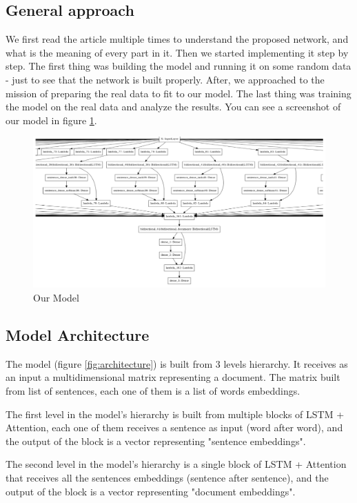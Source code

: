 \documentclass{article}
\begin{document}
\subsection{General approach}
We first read the article multiple times to understand the proposed network, and what is the meaning of every part in it. Then we started implementing it step by step. The first thing was building the model and running it on some random data - just to see that the network is built properly. After, we approached to the mission of preparing the real data to fit to our model. The last thing was training the model on the real data and analyze the results. You can see a screenshot of our model in figure \ref{fig:model}.

\begin{figure}
    \includegraphics[scale=0.7]{Model.PNG}
    \caption{Our Model }
    \label{fig:model}
\end{figure}

\subsection{Model Architecture}
The model (figure \ref{fig:architecture}) is built from 3 levels hierarchy. It receives as an input a multidimensional matrix representing a document. The matrix built from list of sentences, each one of them is a list of words embeddings.

The first level in the model's hierarchy is built from multiple blocks of LSTM + Attention, each one of them receives a sentence as input (word after word), and the output of the block is a vector representing "sentence embeddings".

The second level in the model's hierarchy is a single block of LSTM + Attention that receives all the sentences embeddings (sentence after sentence), and the output of the block is a vector representing "document embeddings".
\end{document}

